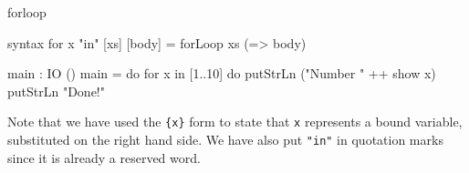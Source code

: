 \begin{SaveVerbatim}{forloop}

syntax for {x} "in" [xs] [body] = forLoop xs (\x => body)
  
main : IO ()
main = do for x in [1..10] do
              putStrLn ("Number " ++ show x)
          putStrLn "Done!"

\end{SaveVerbatim}

\noindent
Note that we have used the \texttt{\{x\}} form to state that \texttt{x} represents
a bound variable, substituted on the right hand side. We have also put \texttt{"in"} in
quotation marks since it is already a reserved word.



